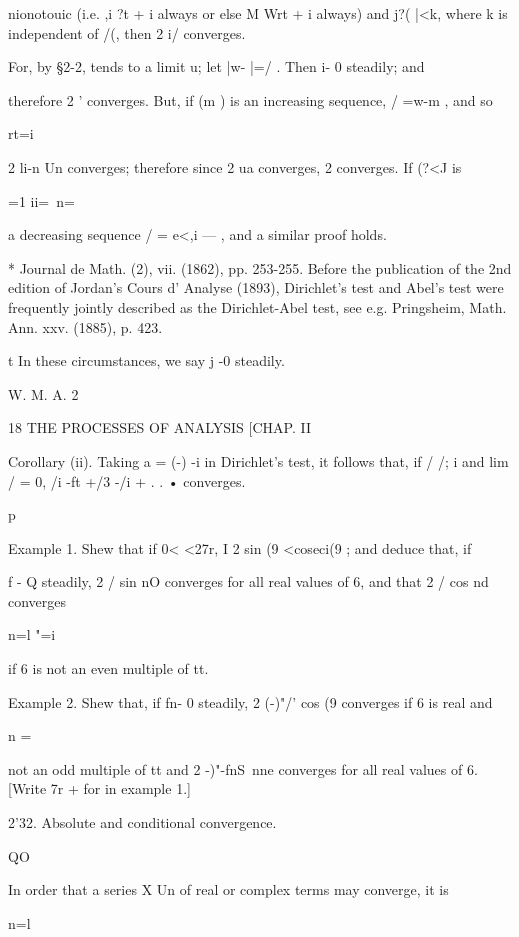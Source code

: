 nionotouic (i.e. ,i ?t + i always or else M Wrt + i always) and j?(
|<k, where k is independent of /(, then 2 i/ converges.

For, by §2-2, tends to a limit u; let |w- |=/ . Then i- 0 steadily;
and

therefore 2 ' converges. But, if (m ) is an increasing sequence, /
=w-m , and so

rt=i

2 li-n Un converges; therefore since 2 ua converges, 2 converges. If
(?<J is

 =1 ii=\ n=\

a decreasing sequence / = e<,i — , and a similar proof holds.

* Journal de Math. (2), vii. (1862), pp. 253-255. Before the
publication of the 2nd edition of Jordan's Cours d' Analyse (1893),
Dirichlet's test and Abel's test were frequently jointly described as
the Dirichlet-Abel test, see e.g. Pringsheim, Math. Ann. xxv. (1885),
p. 423.

t In these circumstances, we say j -0 steadily.

W. M. A. 2



18 THE PROCESSES OF ANALYSIS [CHAP. II

Corollary (ii). Taking a = (-) -i in Dirichlet's test, it follows
that, if / /; i and lim / = 0, /i -ft +/3 -/i + . . • converges.



p



Example 1. Shew that if 0< <27r, I 2 sin (9 <coseci(9 ; and deduce
that, if



f - Q steadily, 2 / sin nO converges for all real values of 6, and
that 2 / cos nd converges

n=l "=i

if 6 is not an even multiple of tt.

Example 2. Shew that, if fn- 0 steadily, 2 (-)"/' cos (9 converges if
6 is real and

n = \

not an odd multiple of tt and 2 -)"-fnS\ nne converges for all real
values of 6. [Write 7r + for in example 1.]

2'32. Absolute and conditional convergence.

QO

In order that a series X Un of real or complex terms may converge, it
is

n=l

